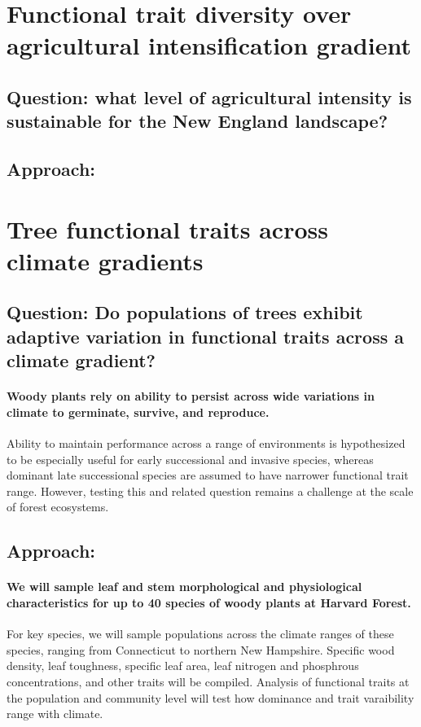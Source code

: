 \documentclass[11pt]{article}
\begin{document}
\section{Functional trait diversity over agricultural intensification gradient}

\subsection{Question: what level of agricultural intensity is sustainable for the New England landscape?}

\subsection{Approach:}

\section{Tree functional traits across climate gradients}

\subsection{Question: Do populations of trees exhibit adaptive variation in functional traits across a climate gradient?}

\paragraph{Woody plants rely on ability to persist across wide variations in climate to germinate, survive, and reproduce.} Ability to maintain performance across a range of environments is hypothesized to be especially useful for early successional and invasive species, whereas dominant late successional species are assumed to have narrower functional trait range. However, testing this and related question remains a challenge at the scale of forest ecosystems.

\subsection{Approach:}

\paragraph{We will sample leaf and stem morphological and physiological characteristics for up to 40 species of woody plants at Harvard Forest.} For key species, we will sample populations across the climate ranges of these species, ranging from Connecticut to northern New Hampshire. Specific wood density, leaf toughness, specific leaf area, leaf nitrogen and phosphrous concentrations, and other traits will be compiled. Analysis of functional traits at the population and community level will test how dominance and trait varaibility range with climate.

\paragraph {}

\end{document}
